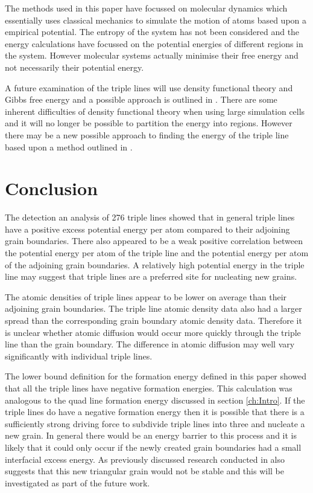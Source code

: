 \documentclass[12pt,a4paper,openany]{report}
\begin{document}
The methods used in this paper have focussed on molecular dynamics which essentially uses classical mechanics to simulate the motion of atoms based upon a empirical potential. The entropy of the system has not been considered and the energy calculations have focussed on the potential energies of different regions in the system. However molecular systems actually minimise their free energy and not necessarily their potential energy. 

A future examination of the triple lines will use density functional theory and Gibbs free energy and a possible approach is outlined in \cite{HASHIBON2010939}. There are some inherent difficulties of density functional theory when using large simulation cells and it will no longer be possible to partition the energy into regions. However there may be a new possible approach to finding the energy of the triple line based upon a method outlined in \cite{Lee2004}.

\section{Conclusion}

The detection an analysis of 276 triple lines showed that in general triple lines have a positive excess potential energy per atom compared to their adjoining grain boundaries. There also appeared to be a weak positive correlation between the potential energy per atom of the triple line and the potential energy per atom of the adjoining grain boundaries. A relatively high potential energy in the triple line may suggest that triple lines are a preferred site for nucleating new grains. 

The atomic densities of triple lines appear to be lower on average than their adjoining grain boundaries. The triple line atomic density data also had a larger spread than the corresponding grain boundary atomic density data. Therefore it is unclear whether atomic diffusion would occur more quickly through the triple line than the grain boundary. The difference in atomic diffusion may well vary significantly with individual triple lines.

The lower bound definition for the formation energy defined in this paper showed that all the triple lines have negative formation energies. This calculation was analogous to the quad line formation energy discussed in section \ref{ch:Intro}. If the triple lines do have a negative formation energy then it is possible that there is a sufficiently strong driving force to subdivide triple lines into three and nucleate a new grain. In general there would be an energy barrier to this process and it is likely that it could only occur if the newly created grain boundaries had a small interfacial excess energy. As previously discussed research conducted in \cite{Shvindlerman2005} also suggests that this new triangular grain would not be stable and this will be investigated as part of the future work.
 


  

 
\end{document}
